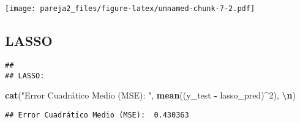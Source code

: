 \documentclass[
]{article}
\newenvironment{Shaded}{\begin{snugshade}}{\end{snugshade}}
\newcommand{\AttributeTok}[1]{\textcolor[rgb]{0.13,0.29,0.53}{#1}}
\newcommand{\DecValTok}[1]{\textcolor[rgb]{0.00,0.00,0.81}{#1}}
\newcommand{\FunctionTok}[1]{\textcolor[rgb]{0.13,0.29,0.53}{\textbf{#1}}}
\newcommand{\NormalTok}[1]{#1}
\newcommand{\OtherTok}[1]{\textcolor[rgb]{0.56,0.35,0.01}{#1}}
\newcommand{\SpecialCharTok}[1]{\textcolor[rgb]{0.81,0.36,0.00}{\textbf{#1}}}
\newcommand{\StringTok}[1]{\textcolor[rgb]{0.31,0.60,0.02}{#1}}
\begin{document}
\texttt{[image: pareja2\_files/figure-latex/unnamed-chunk-7-2.pdf]}

\hypertarget{lasso}{%
\subsection{LASSO}\label{lasso}}

\begin{Shaded}
\end{Shaded}

\begin{verbatim}
## 
## LASSO:
\end{verbatim}

\begin{Shaded}
\begin{Highlighting}[]
\FunctionTok{cat}\NormalTok{(}\StringTok{"Error Cuadrático Medio (MSE): "}\NormalTok{, }\FunctionTok{mean}\NormalTok{((y\_test }\SpecialCharTok{{-}}\NormalTok{ lasso\_pred)}\SpecialCharTok{\^{}}\DecValTok{2}\NormalTok{), }\StringTok{\textquotesingle{}}\SpecialCharTok{\textbackslash{}n}\StringTok{\textquotesingle{}}\NormalTok{)}
\end{Highlighting}
\end{Shaded}

\begin{verbatim}
## Error Cuadrático Medio (MSE):  0.430363
\end{verbatim}
\end{document}
